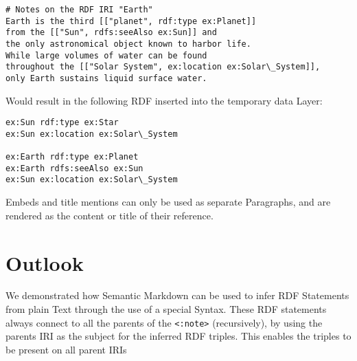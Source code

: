 \begin{verbatim}
# Notes on the RDF IRI "Earth"
Earth is the third [["planet", rdf:type ex:Planet]] 
from the [["Sun", rdfs:seeAlso ex:Sun]] and 
the only astronomical object known to harbor life.
While large volumes of water can be found 
throughout the [["Solar System", ex:location ex:Solar\_System]], 
only Earth sustains liquid surface water.
\end{verbatim}

Would result in the following RDF inserted into the temporary data Layer:

\begin{verbatim}
ex:Sun rdf:type ex:Star
ex:Sun ex:location ex:Solar\_System

ex:Earth rdf:type ex:Planet
ex:Earth rdfs:seeAlso ex:Sun
ex:Sun ex:location ex:Solar\_System
\end{verbatim}


Embeds and title mentions can only be used as separate Paragraphs, and are rendered as the content or title of their reference.

\section{Outlook}

We demonstrated how Semantic Markdown can be used to infer RDF Statements from plain Text through the use of a special Syntax. These RDF statements always connect to all the parents of the \verb|<:note>| (recursively), by using the parents IRI as the subject for the inferred RDF triples. This enables the triples to be present on all parent IRIs

